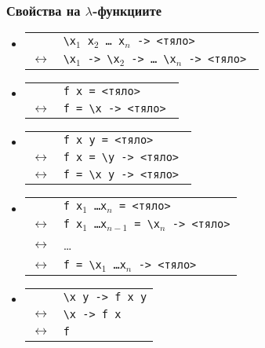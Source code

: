 \documentclass{beamer}
\begin{document}
\begin{frame}
  \frametitle{Свойства на $\lambda$-функциите}
  \newcommand{\eqv}{$\longleftrightarrow$}
  \begin{itemize}[<+->]
  \item
    \begin{tabular}[t]{ll}
      &\tt{\textbackslash x$_1$ x$_2$ \ldots{} x$_n$ ->} <тяло>\\
      \eqv &\tt{\textbackslash x$_1$ -> \textbackslash x$_2$ -> \ldots{} \textbackslash x$_n$ ->}
             <тяло>
    \end{tabular}
  \item
    \begin{tabular}[t]{ll}
      &\tt{f x =} <тяло>\\
      \eqv&  \tt{f = \textbackslash x -> }<тяло>
    \end{tabular}
  \item
    \begin{tabular}[t]{ll}
      &\tt{f x y =} <тяло>\\
      \eqv& \tt{f x = \textbackslash y -> }<тяло>\\
      \eqv& \tt{f = \textbackslash x y -> }<тяло>
    \end{tabular}
  \item
    \begin{tabular}[t]{ll}
      &\tt{f x$_1$ \ldots x$_n$ =} <тяло>\\
      \eqv& \tt{f x$_1$ \ldots x$_{n-1}$ = \textbackslash x$_n$ ->} <тяло>\\
      \eqv& \ldots\\
      \eqv& \tt{f = \textbackslash x$_1$ \ldots x$_n$ -> }<тяло>
    \end{tabular}
  \item
    \begin{tabular}[t]{ll}
      &\tt{\textbackslash x y -> f x y}\\
      \eqv& \tt{\textbackslash x -> f x}\\
      \eqv& \tt f
    \end{tabular}
  \end{itemize}
\end{frame}
\end{document}
